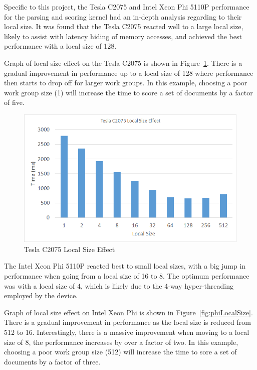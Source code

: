 Specific to this project, the Tesla C2075 and Intel Xeon Phi 5110P performance
for the parsing and scoring kernel had an in-depth analysis regarding to their
local size. It was found that the Tesla C2075 reacted well to a large local
size, likely to assist with latency hiding of memory accesses, and achieved the
best performance with a local size of 128.

Graph of local size effect on the Tesla C2075 is shown in
Figure~\ref{fig:teslaLocalSize}. There is a gradual improvement in performance
up to a local size of 128 where performance then starts to drop off for larger
work groups. In this example, choosing a poor work group size (1) will increase
the time to score a set of documents by a factor of five.

\begin{figure}[H]
\includegraphics[width=\linewidth]{images/teslaLocalSize.png}
\caption{Tesla C2075 Local Size Effect}
\label{fig:teslaLocalSize}
\end{figure}

The Intel Xeon Phi 5110P reacted best to small local sizes, with a big jump in
performance when going from a local size of 16 to 8. The optimum performance was
with a local size of 4, which is likely due to the 4-way hyper-threading
employed by the device.

Graph of local size effect on Intel Xeon Phi is shown in
Figure~\ref{fig:phiLocalSize}. There is a gradual improvement in performance as
the local size is reduced from 512 to 16. Interestingly, there is a massive
improvement when moving to a local size of 8, the performance increases by over
a factor of two. In this example, choosing a poor work group size (512) will
increase the time to sore a set of documents by a factor of three.

